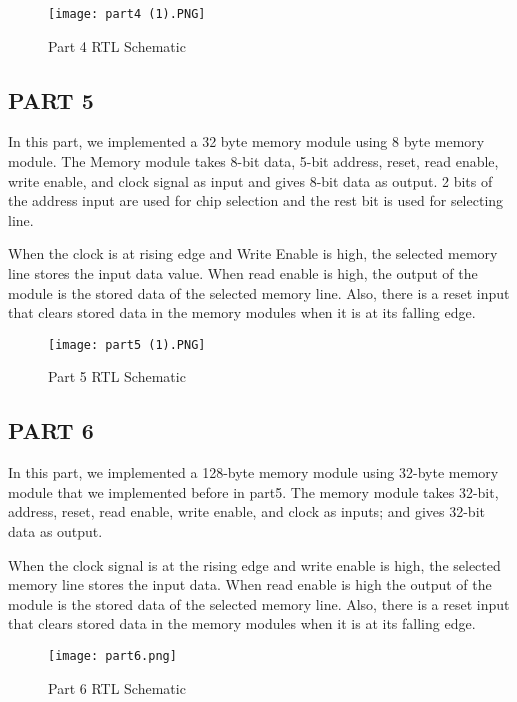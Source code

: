 \documentclass[pdftex,12pt,a4paper]{article}
\begin{document}
\begin{figure}[hbt!]
	\centering
	\texttt{[image: part4 (1).PNG]}	
	\caption{Part 4 RTL Schematic}
	\label{fig1}
\end{figure}



\clearpage

\subsection{PART 5}
In this part, we implemented a 32 byte memory module using 8 byte memory module. The Memory module takes 8-bit data,  5-bit address, reset, read enable, write enable, and clock signal as input and gives 8-bit data as output. 2 bits of the address input are used for chip selection and the rest bit is used for selecting line. 

When the clock is at rising edge and Write Enable is high, the selected memory line stores the input data value. When read enable is high, the output of the module is the stored data of the selected memory line. Also, there is a reset input that clears stored data in the memory modules when it is at its falling edge.
\begin{figure}[hbt!]
	\centering
	\texttt{[image: part5 (1).PNG]}	
	\caption{Part 5 RTL Schematic}
	\label{fig1}
\end{figure}



\clearpage

\subsection{PART 6}
In this part, we implemented a 128-byte memory module using 32-byte memory module that we implemented before in part5. The memory module takes 32-bit, address, reset, read enable, write enable, and clock as inputs; and gives 32-bit data as output. 

When the clock signal is at the rising edge and write enable is high, the selected memory line stores the input data. When read enable is high the output of the module is the stored data of the selected memory line.  Also, there is a reset input that clears stored data in the memory modules when it is at its falling edge.

\begin{figure}[hbt!]
	\centering
	\texttt{[image: part6.png]}	
	\caption{Part 6 RTL Schematic}
	\label{fig1}
\end{figure}
\end{document}
